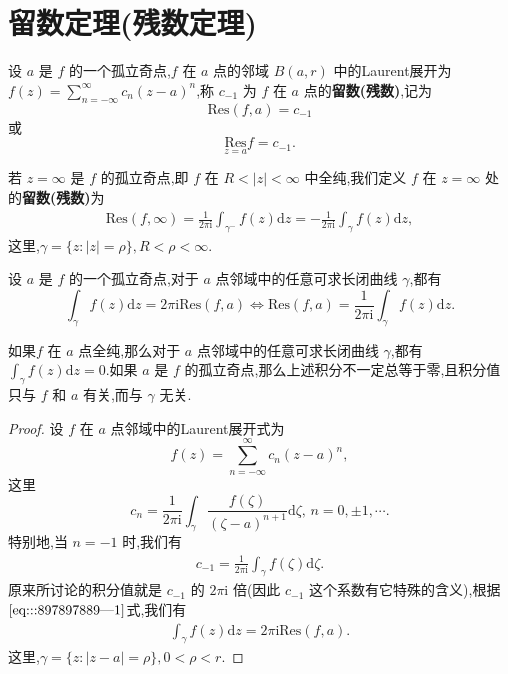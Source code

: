 \documentclass[../../main.tex]{subfiles}%
\begin{document}
\section{留数定理(残数定理)}

\begin{definition}
设 \( a \) 是 \( f \) 的一个孤立奇点,\( f \) 在 \( a \) 点的邻域 \( B(a,r) \) 中的Laurent展开为 \( f(z) = \sum_{n = -\infty}^{\infty} c_n (z - a)^n \),称 \( c_{-1} \) 为 \( f \) 在 \( a \) 点的\textbf{留数(残数)},记为
\[
\mathrm{Res}(f,a) = c_{-1}
\]
或
\[
\underset{z = a}{\mathrm{Res}} f = c_{-1}.
\]

若 \( z = \infty \) 是 \( f \) 的孤立奇点,即 \( f \) 在 \( R < |z| < \infty \) 中全纯,我们定义 \( f \) 在 \( z = \infty \) 处的\textbf{留数(残数)}为
\begin{align}
\mathrm{Res}(f,\infty) =\frac{1}{2\pi \mathrm{i}} \int_{\gamma^-} f(z) \mathrm{d}z= -\frac{1}{2\pi \mathrm{i}} \int_{\gamma} f(z) \mathrm{d}z, \label{eq:::897897889---3}
\end{align}
这里,\( \gamma = \{ z: |z| = \rho \}, R < \rho < \infty \).
\end{definition}

\begin{proposition}\label{proposition:积分与留数的关系}
设 \( a \) 是 \( f \) 的一个孤立奇点,对于 \( a \) 点邻域中的任意可求长闭曲线 \( \gamma \),都有
$$
\int_{\gamma} f(z) \mathrm{d}z = 2\pi \mathrm{i} \mathrm{Res}(f,a)\iff \mathrm{Res}\left( f,a \right) =\frac{1}{2\pi \mathrm{i}}\int_{\gamma}{f(z)\mathrm{d}z}.
$$
\end{proposition}
\begin{remark}
如果\( f \) 在 \( a \) 点全纯,那么对于 \( a \) 点邻域中的任意可求长闭曲线 \( \gamma \),都有 \( \int_{\gamma} f(z) \mathrm{d}z = 0 \).如果 \( a \) 是 \( f \) 的孤立奇点,那么上述积分不一定总等于零,且积分值只与 \( f \) 和 \( a \) 有关,而与 \( \gamma \) 无关.
\end{remark}
\begin{proof}

设 \( f \) 在 \( a \) 点邻域中的Laurent展开式为
\[
f(z) = \sum_{n = -\infty}^{\infty} c_n (z - a)^n,
\]
这里
\[
c_n = \frac{1}{2\pi \mathrm{i}} \int_{\gamma} \frac{f(\zeta)}{(\zeta - a)^{n + 1}} \mathrm{d}\zeta, \, n = 0, \pm 1, \cdots.
\]
特别地,当 \( n = -1 \) 时,我们有
\begin{align}
c_{-1} = \frac{1}{2\pi \mathrm{i}} \int_{\gamma} f(\zeta) \mathrm{d}\zeta. \label{eq:::897897889---1}
\end{align}
原来所讨论的积分值就是 \( c_{-1} \) 的 \( 2\pi \mathrm{i} \) 倍(因此 \( c_{-1} \) 这个系数有它特殊的含义),根据\(\eqref{eq:::897897889---1}\)式,我们有
\begin{align}
\int_{\gamma} f(z) \mathrm{d}z = 2\pi \mathrm{i} \mathrm{Res}(f,a). \label{eq:::897897889---2}
\end{align}
这里,\( \gamma = \{ z: |z - a| = \rho \}, 0 < \rho < r \).

\end{proof}
\end{document}
